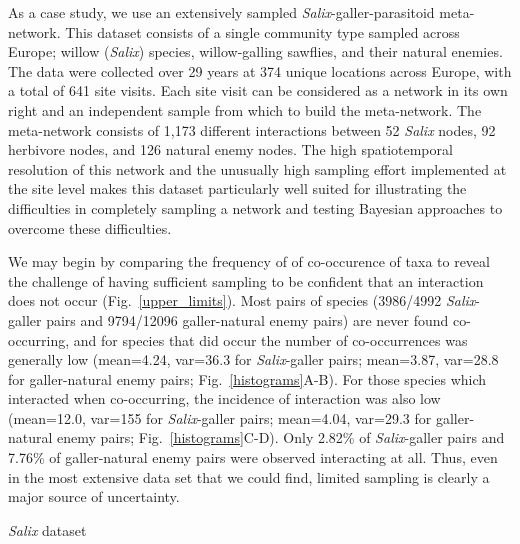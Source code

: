 \documentclass[12pt]{article}
\begin{document}
\begin{floatbox}{}

    
    \indent As a case study, we use an extensively sampled \emph{Salix}-galler-parasitoid meta-network. This dataset consists of a single community type sampled across Europe; willow (\emph{Salix}) species, willow-galling sawflies, and their natural enemies. The data were collected over 29 years at 374 unique locations across Europe, with a total of 641 site visits. Each site visit can be considered as a network in its own right and an independent sample from which to build the meta-network. The meta-network consists of 1,173 different interactions between 52 \emph{Salix} nodes, 92 herbivore nodes, and 126 natural enemy nodes. The high spatiotemporal resolution of this network and the unusually high sampling effort implemented at the site level makes this dataset particularly well suited for illustrating the difficulties in completely sampling a network and testing Bayesian approaches to overcome these difficulties.


    \indent We may begin by comparing the frequency of of co-occurence of taxa to reveal the challenge of having sufficient sampling to be confident that an interaction does not occur (Fig.~\ref{upper_limits}). Most pairs of species (3986/4992 \emph{Salix}-galler pairs and  9794/12096 galler-natural enemy pairs) are never found co-occurring, and for species that did occur the number of co-occurrences was generally low (mean=4.24, var=36.3 for \emph{Salix}-galler pairs; mean=3.87, var=28.8 for galler-natural enemy pairs; Fig.~\ref{histograms}A-B). For those species which interacted when co-occurring, the incidence of interaction was also low (mean=12.0, var=155 for \emph{Salix}-galler pairs; mean=4.04, var=29.3 for galler-natural enemy pairs; Fig.~\ref{histograms}C-D). Only 2.82\% of \emph{Salix}-galler pairs and 7.76\% of galler-natural enemy pairs were observed interacting at all. Thus, even in the most extensive data set that we could find, limited sampling is clearly a major source of uncertainty.

  \caption{\emph{Salix} dataset}
  \label{box1}
\end{floatbox}
\end{document}

